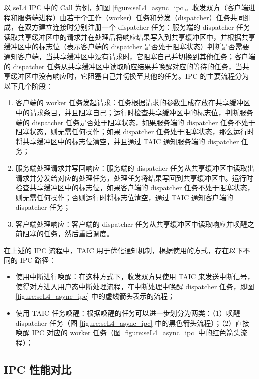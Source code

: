 以 seL4 IPC 中的 Call 为例，如图 \ref{figure:seL4_async_ipc}。收发双方（客户端进程和服务端进程）由若干个工作（worker）任务和分发（dispatcher）任务共同组成，在双方建立连接时分别注册一个 dispatcher 任务：服务端的 dispatcher 任务读取共享缓冲区中的请求并在处理后将响应结果写入到共享缓冲区中，并根据共享缓冲区中的标志位（表示客户端的 dispatcher 是否处于阻塞状态）判断是否需要通知客户端，当共享缓冲区中没有请求时，它阻塞自己并切换到其他任务；客户端的 dispatcher 任务从共享缓冲区中读取响应结果并唤醒对应的等待的任务，当共享缓冲区中没有响应时，它阻塞自己并切换至其他的任务。IPC 的主要流程分为以下几个阶段：

\begin{enumerate}
    \item 客户端的 worker 任务发起请求：任务根据请求的参数生成存放在共享缓冲区中的请求条目，并且阻塞自己；运行时检查共享缓冲区中的标志位，判断服务端的 dispatcher 任务是否处于阻塞状态，如果服务端的 dispatcher 任务不处于阻塞状态，则无需任何操作；如果 dispatcher 任务处于阻塞状态，那么运行时将共享缓冲区中的标志位清空，并且通过 TAIC 通知服务端的 dispatcher 任务；
    \item 服务端处理请求并写回响应：服务端的 dispatcher 任务从共享缓冲区中读取出请求并分发给对应的处理任务，处理任务将结果写回到共享缓冲区中。运行时检查共享缓冲区中的标志位，如果客户端的 dispatcher 任务不处于阻塞状态，则无需任何操作；否则运行时将标志位清空，通过 TAIC 通知客户端的 dispatcher 任务；
    \item 客户端处理响应：客户端的 dispatcher 任务从共享缓冲区中读取响应并唤醒之前阻塞的任务，然后重启调度。
\end{enumerate}

在上述的 IPC 流程中，TAIC 用于优化通知机制，根据使用的方式，存在以下不同的 IPC 路径：

\begin{itemize}
    \item 使用中断进行唤醒：在这种方式下，收发双方只使用 TAIC 来发送中断信号，使得对方进入用户态中断处理流程，在中断处理中唤醒 dispatcher 任务，即图 \ref{figure:seL4_async_ipc} 中的虚线箭头表示的流程；
    \item 使用 TAIC 任务唤醒：根据唤醒的任务可以进一步划分为两类：（1）唤醒 dispatcher 任务（图 \ref{figure:seL4_async_ipc} 中的黑色箭头流程）；（2）直接唤醒 IPC 对应的 worker 任务（图 \ref{figure:seL4_async_ipc} 中的红色箭头流程）；
\end{itemize}

\subsection{IPC 性能对比}

